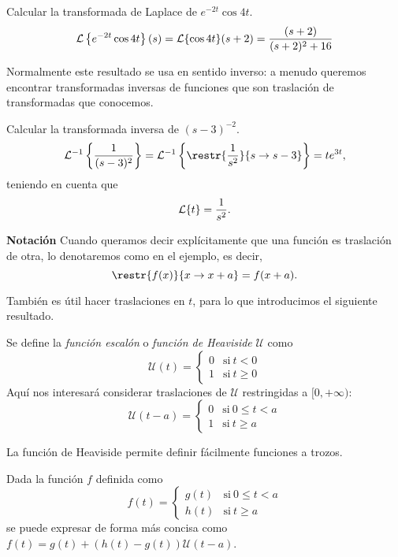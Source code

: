 \documentclass[../main.tex]{subfiles}
\begin{document}
\begin{example}
  Calcular la transformada de Laplace de \(e^{-2t} \cos 4t\).
  \[\mathcal{L}\left\{e^{-2t} \cos 4t\right\}(s) = \mathcal{L}\{\cos 4t\}(s+2) = \frac{(s+2)}{(s+2)^2+16}\]
\end{example}

Normalmente este resultado se usa en sentido inverso: a menudo queremos
encontrar transformadas inversas de funciones que son traslación de
transformadas que conocemos.

\begin{example}
  Calcular la transformada inversa de \((s-3)^{-2}\).
  \[\L^{-1}\left\{\frac{1}{(s-3)^2}\right\} = \L^{-1}\left\{\restr{\frac{1}{s^2}}{s
        \to s-3}\right\} = te^{3t},\]
  teniendo en cuenta que
  \[\mathcal{L}\{t\} = \frac{1}{s^2}.\]
\end{example}

\textbf{Notación} Cuando queramos decir explícitamente que una función es
traslación de otra, lo denotaremos como en el ejemplo, es decir,
\[\restr{f(x)}{x \to x+a} = f(x+a).\]

También es útil hacer traslaciones en \(t\), para lo que introducimos el
siguiente resultado.

\begin{definition}
  Se define la \emph{función escalón} o \emph{función de Heaviside} \(\mathcal{U}\) como
  \[\mathcal{U}(t) =
    \begin{cases}
      0 & \mathrm{si}\ t < 0 \\
      1 & \mathrm{si}\ t \geq 0
    \end{cases}
  \]
  Aquí nos interesará considerar traslaciones de \(\mathcal{U}\) restringidas a
  \([0,+\infty)\):
  \[\mathcal{U}(t-a) =
    \begin{cases}
      0 & \mathrm{si}\ 0 \leq t < a \\
      1 & \mathrm{si}\ t \geq a
    \end{cases}
  \]
\end{definition}

La función de Heaviside permite definir fácilmente funciones a trozos.

\begin{example}
  Dada la función \(f\) definida como
  \[f(t) =
    \begin{cases}
      g(t) & \mathrm{si}\ 0 \leq t < a \\
      h(t) & \mathrm{si}\ t \geq a
    \end{cases}
  \]
  se puede expresar de forma más concisa como
  \(f(t) = g(t) + (h(t)-g(t))\mathcal{U}(t-a)\).
\end{example}
\end{document}
